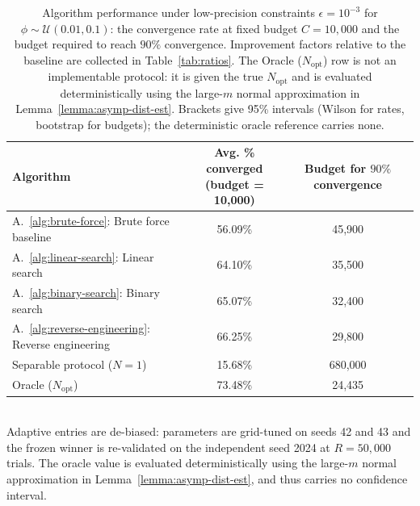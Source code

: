 \begin{table}[ht]
\centering
\caption{Algorithm performance under low-precision constraints $\epsilon=10^{-3}$ for $\phi\sim\mathcal{U}(0.01,0.1)$: the convergence rate at fixed budget $C=10{,}000$ and the budget required to reach \(90\%\) convergence. Improvement factors relative to the baseline are collected in Table~\ref{tab:ratios}. The Oracle ($N_\text{opt}$) row is not an implementable protocol: it is given the true $N_\text{opt}$ and is evaluated deterministically using the large-$m$ normal approximation in Lemma~\ref{lemma:asymp-dist-est}. Brackets give 95\% intervals (Wilson for rates, bootstrap for budgets); the deterministic oracle reference carries none.}
\label{tab:summary-low-prec-ci}
\begin{tabular}{lcc}
\toprule
Algorithm
& \makecell{Avg. \% converged \\ (budget = 10{,}000)}
& \makecell{Budget for $90\%$ \\ convergence} \\
\midrule
A.~\ref{alg:brute-force}: Brute force baseline
& 56.09\%\hspace{0.45em}{\scriptsize [55.66, 56.53]}
& 45{,}900\hspace{0.45em}{\scriptsize [45{,}300, 46{,}500]} \\
A.~\ref{alg:linear-search}: Linear search
& 64.10\%\hspace{0.45em}{\scriptsize [63.68, 64.52]}
& 35{,}500\hspace{0.45em}{\scriptsize [34{,}900, 36{,}000]} \\
A.~\ref{alg:binary-search}: Binary search
& 65.07\%\hspace{0.45em}{\scriptsize [64.65, 65.49]}
& 32{,}400\hspace{0.45em}{\scriptsize [32{,}000, 32{,}900]} \\
A.~\ref{alg:reverse-engineering}: Reverse engineering
& 66.25\%\hspace{0.45em}{\scriptsize [65.84, 66.67]}
& 29{,}800\hspace{0.45em}{\scriptsize [29{,}200, 30{,}300]} \\
\midrule
Separable protocol ($N=1$)
& 15.68\%\hspace{0.45em}{\scriptsize [15.36, 16.00]}
& 680{,}000\hspace{0.45em}{\scriptsize [669{,}000, 691{,}000]} \\
\midrule
Oracle ($N_\text{opt}$)
& 73.48\%
& 24{,}435 \\
\bottomrule
\end{tabular}
\\[2pt]
\footnotesize Adaptive entries are de-biased: parameters are grid-tuned on seeds 42 and 43 and the frozen winner is re-validated on the independent seed 2024 at $R=50{,}000$ trials. The oracle value is evaluated deterministically using the large-$m$ normal approximation in Lemma~\ref{lemma:asymp-dist-est}, and thus carries no confidence interval.
\end{table}

